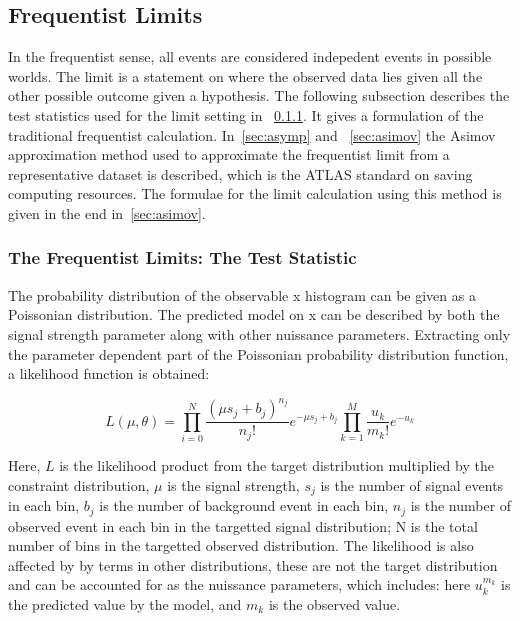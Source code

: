 \subsection{Frequentist Limits}
\label{sec:freq}
In the frequentist sense, all events are considered indepedent events in possible worlds. The limit is a statement on where the observed data lies given all the other possible outcome given a hypothesis. 
The following subsection describes the test statistics used for the limit setting in ~\ref{sec:freqTestStats}. It gives a formulation of the traditional frequentist calculation. In~\ref{sec:asymp} and ~\ref{sec:asimov} the Asimov approximation method used to approximate the frequentist limit from a representative dataset is described, which is the ATLAS standard on saving computing resources. The formulae for the limit calculation using this method is given in the end
in~\ref{sec:asimov}.

\subsubsection{The Frequentist Limits: The Test Statistic}
\label{sec:freqTestStats}

The probability distribution of the observable x histogram can be given as a Poissonian distribution. The predicted model on x can be described by both the signal strength parameter along with other nuissance parameters. Extracting only the parameter dependent part of the Poissonian probability distribution function, a likelihood function is obtained:

\begin{equation}
    L(\mu, \theta) =  \prod_{i=0}^{N} \frac{(\mu s_{j} + b_{j})^{n_j}}{n_{j}!}e^{-\mu s_j + b_j} \prod_{k=1}^{M}\frac{u_{k}}
{m_{k}!} e^{-u_{k}}
\label{eq:likelihood}
\end{equation}

Here, $L$ is the likelihood product from the target distribution multiplied by the constraint distribution, $\mu$ is the signal strength, $s_j$ is the number of signal events in each bin, $b_j$ is the number of background event in each bin, $n_j$ is the number of observed event in each bin in the targetted signal distribution; N is the total number of bins in the targetted observed distribution. The likelihood is also affected by by terms in other distributions, these
are not the target distribution and can be accounted for as the nuissance parameters, which
includes:
here $u_k^{m_k}$ is the predicted value by the model, and $m_{k}$ is the observed value. 

